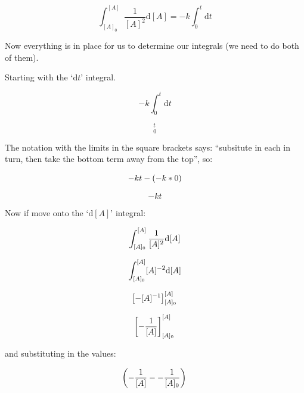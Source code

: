 \documentclass[
]{book}
\begin{document}
\begin{equation*}
\int _{[A]_0} ^{[A]} \frac{1}{[A]^2} \textrm{d}[A]=  - k \int _0 ^t \textrm{d}t
\end{equation*}

Now everything is in place for us to determine our integrals (we need to do both of them).

Starting with the `\(\textrm{d}t\)' integral.

\begin{equation*}
- k \int _0 ^t \textrm{d}t
\end{equation*}

\begin{equation*}
[-kt]_0^t
\end{equation*}

The notation with the limits in the square brackets says: ``subsitute in each in turn, then take the bottom term away from the top'', so:

\begin{equation*}
-kt - (-k*0)\\
\end{equation*}

\begin{equation*}
-kt
\end{equation*}

Now if move onto the `\(\textrm{d}[A]\)' integral:

\begin{equation*}
\int_{[A]_0}^{[A]} \frac{1}{[A]^2} \textrm{d}[A]\\
\end{equation*}

\begin{equation*}
\int_{[A]_0}^{[A]} [A]^{-2}\textrm{d}[A]\\
\end{equation*}

\begin{equation*}
\left[-[A]^{-1} \right] _{[A]_0}^{[A]}\\
\end{equation*}

\begin{equation*}
\left[-\frac{1}{[A]} \right] _{[A]_0}^{[A]}\\
\end{equation*}

and substituting in the values:

\begin{equation*}
\left(-\frac{1}{[A]}--\frac{1}{[A]_0} \right)\\
\end{equation*}
\end{document}
